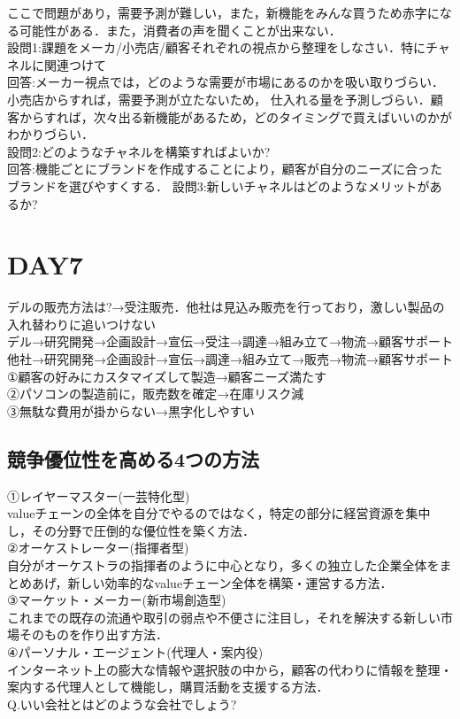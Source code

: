 \documentclass[a4paper,11pt]{ltjsarticle}
\begin{document}
ここで問題があり，需要予測が難しい，また，新機能をみんな買うため赤字になる可能性がある．また，消費者の声を聞くことが出来ない．\\
設問1:課題をメーカ/小売店/顧客それぞれの視点から整理をしなさい．特にチャネルに関連つけて\\
回答:メーカー視点では，どのような需要が市場にあるのかを吸い取りづらい．小売店からすれば，需要予測が立たないため，
仕入れる量を予測しづらい．顧客からすれば，次々出る新機能があるため，どのタイミングで買えばいいのかがわかりづらい．\\
設問2:どのようなチャネルを構築すればよいか?\\
回答:機能ごとにブランドを作成することにより，顧客が自分のニーズに合ったブランドを選びやすくする．
設問3:新しいチャネルはどのようなメリットがあるか?\\
\section{DAY7}
デルの販売方法は?→受注販売．他社は見込み販売を行っており，激しい製品の入れ替わりに追いつけない\\
デル→研究開発→企画設計→宣伝→受注→調達→組み立て→物流→顧客サポート\\
他社→研究開発→企画設計→宣伝→調達→組み立て→販売→物流→顧客サポート\\
①顧客の好みにカスタマイズして製造→顧客ニーズ満たす\\
②パソコンの製造前に，販売数を確定→在庫リスク減\\
③無駄な費用が掛からない→黒字化しやすい
\subsection{競争優位性を高める4つの方法}
①レイヤーマスター(一芸特化型)\\
valueチェーンの全体を自分でやるのではなく，特定の部分に経営資源を集中し，その分野で圧倒的な優位性を築く方法．\\
②オーケストレーター(指揮者型)\\
自分がオーケストラの指揮者のように中心となり，多くの独立した企業全体をまとめあげ，新しい効率的なvalueチェーン全体を構築・運営する方法．\\
③マーケット・メーカー(新市場創造型)\\
これまでの既存の流通や取引の弱点や不便さに注目し，それを解決する新しい市場そのものを作り出す方法．\\
④パーソナル・エージェント(代理人・案内役)\\
インターネット上の膨大な情報や選択肢の中から，顧客の代わりに情報を整理・案内する代理人として機能し，購買活動を支援する方法．\\
Q.いい会社とはどのような会社でしょう?\\
\end{document}
